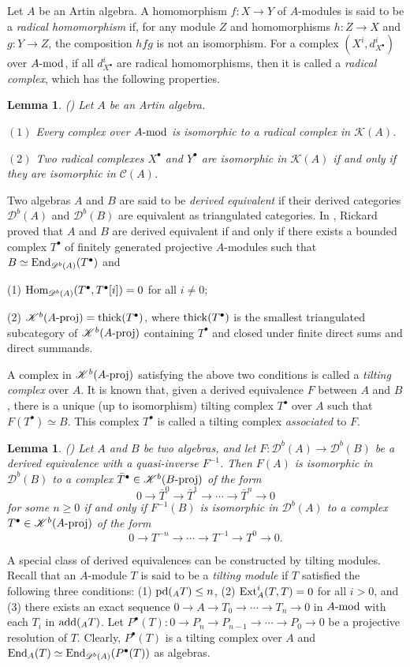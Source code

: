 \documentclass[12pt]{article}
\numberwithin{equation}{section}
\newtheorem{Lem}[Def]{Lemma}
\theoremstyle{definition}
\newcommand{\add}{{\rm add}}
\newcommand{\End}{{\rm End}}
\newcommand{\pd}{{\rm pd}}
\newcommand{\cpx}[1]{#1^{\bullet}}
\newcommand{\Db}[1]{{\mathscr D}^b(#1)}
\newcommand{\C}[1]{{\mathscr C}(#1)}
\newcommand{\K}[1]{{\mathscr K}(#1)}
\newcommand{\Kb}[1]{{\mathscr K}^b(#1)}
\newcommand{\modcat}{\ensuremath{\mbox{{\rm -mod}}}}
\newcommand{\pmodcat}[1]{#1\mbox{{\rm -proj}}}
\newcommand{\Hom}{{\rm Hom}}
\newcommand{\Ext}{{\rm Ext}}
\newcommand{\lra}{\longrightarrow}
\newcommand{\ra}{\rightarrow}
\begin{document}
Let $A$ be an Artin algebra.
A homomorphism $f: X\ra Y$ of $A$-modules is said to be a \emph{radical homomorphism} if, for any module $Z$ and homomorphisms $h: Z\ra X$ and $g: Y\ra Z$, the composition $hfg$ is not an isomorphism.
For a complex $(X^i, d_{\cpx{X}}^i)$ over $A\modcat$, if all $d_{\cpx{X}}^i$ are radical homomorphisms, then it is called a \emph{radical complex}, which has the following properties.
\begin{Lem}\label{radical}
{\rm (\cite[pp. 112-113]{hx10})}
Let $A$ be an Artin algebra.

$(1)$ Every complex over $A\modcat$ is isomorphic to a radical complex in $\K{A}$.

$(2)$ Two radical complexes $\cpx{X}$ and $\cpx{Y}$ are isomorphic in $\K{A}$ if and only if they are isomorphic in $\C{A}$.
\end{Lem}

Two algebras $A$ and $B$ are said to be \emph{derived equivalent} if their derived categories $\Db{A}$ and $\Db{B}$ are equivalent as
triangulated categories. In \cite{r1989}, Rickard proved that $A$ and $B$ are derived equivalent if and only if there exists a bounded complex $\cpx{T}$ of finitely generated projective $A$-modules such that $B\simeq\End_{\Db{A}}(\cpx{T})$ and

(1) $\Hom_{\Db{A}}(\cpx{T},\cpx{T}[i])=0$ for all $i\ne 0$;

(2) $\Kb{\pmodcat{A}}={\rm thick}(T^{\bullet})$, where ${\rm thick}(T^{\bullet})$ is the smallest triangulated subcategory of $\Kb{\pmodcat{A}}$ containing $T^{\bullet}$ and closed under finite direct sums and direct summands.

{\parindent=0pt} A complex in $\Kb{\pmodcat{A}}$ satisfying the above two conditions is called a \emph{tilting complex} over $A$. It is known that, given a derived equivalence $F$ between $A$ and $B$, there is a unique (up to isomorphism) tilting complex $\cpx{T}$ over $A$ such that $F(\cpx{T})\simeq B$. This complex $\cpx{T}$ is called a tilting complex \emph{associated} to $F$.

\begin{Lem}\label{der-lem}{\rm (\cite[Lemma 2.1]{hx10})}
Let $A$ and $B$ be two algebras, and let $F: \Db{A}\lra \Db{B}$ be a derived equivalence with a quasi-inverse $F^{-1}$. Then $F(A)$ is isomorphic in $\Db{B}$ to a complex $\cpx{\bar{T}}\in\Kb{\pmodcat{B}}$  of the form
$$0\lra \bar{T}^0\lra \bar{T}^1\lra\cdots\lra\bar{T}^n\lra 0$$
for some $n\geq 0$ if and only if $F^{-1}(B)$ is isomorphic  in $\Db{A}$ to a complex $\cpx{T}\in\Kb{\pmodcat{A}}$ of the form
$$0\lra T^{-n}\lra\cdots\lra T^{-1}\lra T^0\lra 0.$$
\end{Lem}
A special class of derived equivalences can be constructed by tilting modules. Recall that an $A$-module $T$ is said to be a \emph{tilting module} if $T$ satisfied the following three conditions: (1) $\pd(_AT)\le n$, (2) $\Ext_A^i(T,T)=0$ for all $i>0$, and (3) there exists an exact sequence $0\ra A\ra T_0\ra \cdots\ra T_n\ra 0$ in $A\modcat$ with each $T_i$ in $\add(_AT)$. Let $P^{\bullet}(T): 0\ra  P_{n}\ra P_{n-1}\ra \cdots\ra P_{0}\ra 0$ be a projective resolution of $T$. Clearly, $P^{\bullet}(T)$ is a tilting complex over $A$ and $\End_{A}(T) \simeq \End_{\Db{A}}(P^{\bullet}(T))$ as algebras.
\end{document}
